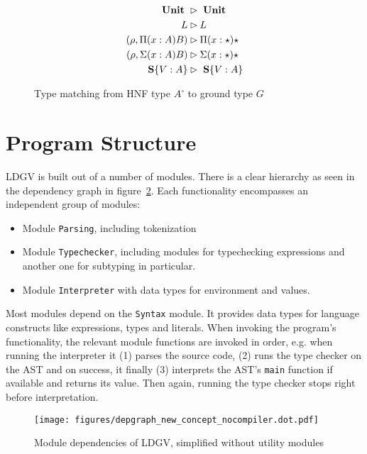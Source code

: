 \begin{figure}
\begin{align*}
\text{ \textbf{Unit} } &\rhd \text{ \textbf{Unit} } \\
L &\rhd L \\
(\rho, \Pi (x:A)B) &\rhd \Pi(x:\star)\star \\
(\rho, \Sigma (x:A)B) &\rhd \Sigma(x:\star)\star \\
\text{ \textbf{S}} \{ V:A \} &\rhd \text{ \textbf{S}} \{ V : A \}
\end{align*}
\caption{Type matching from HNF type $A^\circ$ to ground type $G$}
\label{fig:ccldlc-type-matching}
\end{figure}

\section{Program Structure}\label{sec:program-structure}

LDGV is built out of a number of modules. There is a clear hierarchy as seen in the dependency graph in figure~\ref{fig:dependency-graph}. Each functionality encompasses an independent group of modules:

\begin{itemize}
 \item Module \texttt{Parsing}, including tokenization
 \item Module \texttt{Typechecker}, including modules for typechecking expressions and another one for subtyping in particular.
 \item Module \texttt{Interpreter} with data types for environment and values.
\end{itemize}

Most modules depend on the \texttt{Syntax} module. It provides data types for language constructs like expressions, types and literals. When invoking the program's functionality, the relevant module functions are invoked in order, e.g. when running the interpreter it (1) parses the source code, (2) runs the type checker on the AST and on success, it finally (3) interprets the AST's \texttt{main} function if available and returns its value.   Then again, running the type checker stops right before interpretation.

\begin{figure}
 \centering
 \texttt{[image: figures/depgraph\_new\_concept\_nocompiler.dot.pdf]}
 \caption[Module dependencies of LDGV]{Module dependencies of LDGV, simplified without utility modules}
 \label{fig:dependency-graph}
\end{figure}

